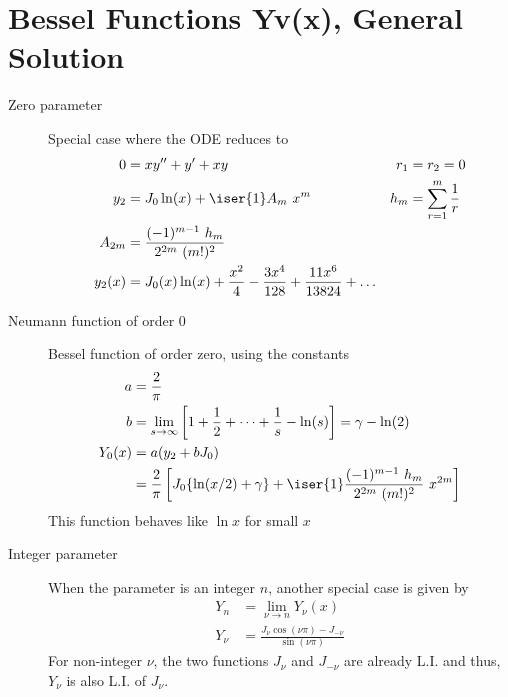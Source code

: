 \section{Bessel Functions Yv(x), General Solution}
\begin{description}
    \item[Zero parameter] Special case where the ODE reduces to
        \begin{align}
            0      & = xy'' + y' + xy                                   &
            r_1    & = r_2 = 0                                            \\
            y_2    & = J_0 \ln(x) + \iser{1}A_m\ x^m                    &
            h_m    & = \sum_{r=1}^{m} \frac{1}{r}                         \\
            A_{2m} & = \frac{(-1)^{m-1}\ h_m}{2^{2m}\ (m!)^2}             \\
            y_2(x) & = J_0(x) \ln(x) + \frac{x^2}{4} - \frac{3x^4}{128}
            + \frac{11x^6}{13824} + \dots
        \end{align}

    \item[Neumann function of order 0] Bessel function of order zero, using the constants
        \begin{align}
            a      & = \frac{2}{\pi}                                      \\
            b      & = \lim_{s \to \infty} \left[ 1 + \frac{1}{2} + \dots
            + \frac{1}{s} - \ln(s) \right] = \gamma - \ln(2)              \\
            Y_0(x) & = a(y_2 + bJ_0)                                      \\
                   & = \frac{2}{\pi} \left[ J_0 \{\ln(x/2) + \gamma\}
                + \iser{1} \frac{(-1)^{m-1}\ h_m}{2^{2m}\ (m!)^2}\ x^{2m} \right]
        \end{align}
        This function behaves like $ \ln x $ for small $ x $

    \item[Integer parameter] When the parameter is an integer $ n $, another special case
        is given by
        \begin{align}
            Y_n   & = \lim_{\nu \to n}Y_\nu (x)                            \\
            Y_\nu & = \frac{J_\nu \cos(\nu \pi) - J_{-\nu}}{\sin(\nu \pi)}
        \end{align}
        For non-integer $ \nu $, the two functions $ J_\nu $ and $ J_{-\nu} $ are
        already L.I. and thus, $ Y_\nu $ is also L.I. of $ J_\nu $. \par


\end{description}
